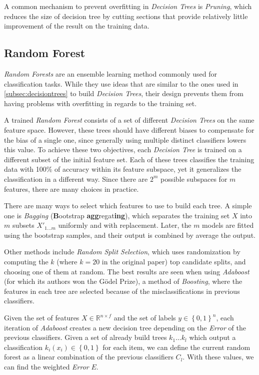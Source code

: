 A common mechanism to prevent overfitting in \emph{Decision Trees} is \emph{Pruning}, which reduces the size of decision tree by cutting sections that provide relatively little improvement of the result on the training data.

\subsection{Random Forest}
\label{subsec:randomforest}

\emph{Random Forests} are an ensemble learning method commonly used for classification tasks.
While they use ideas that are similar to the ones used in \cref{subsec:decisiontrees} to build \emph{Decision Trees}, their design prevents them from having problems with overfitting in regards to the training set\cite{rupert2004elements}.

A trained \emph{Random Forest} consists of a set of different \emph{Decision Trees} on the same feature space.
However, these trees should have different biases to compensate for the bias of a single one, since generally using multiple distinct classifiers lowers this value\cite{ho1994decision}.
To achieve these two objectives, each \emph{Decision Tree} is trained on a different subset of the initial feature set\cite{ho1995random}.
Each of these trees classifies the training data with 100\% of accuracy within its feature subspace, yet it generalizes the classification in a different way. 
Since there are $2^m$ possible subspaces for $m$ features, there are many choices in practice.

There are many ways to select which features to use to build each tree.
A simple one is \emph{Bagging} (\textbf{B}ootstrap \textbf{agg}regat\textbf{ing})\cite{breiman1996bagging}, which separates the training set $X$ into $m$ subsets $X'_{1 \dots m}$ uniformly and with replacement.
Later, the $m$ models are fitted using the bootstrap samples, and their output is combined by average the output.

Other methods include \emph{Random Split Selection}, which uses randomization by computing the $k$ (where $k = 20$ in the original paper) top candidate splits, and choosing one of them at random\cite{dietterich2000experimental}.
The best results are seen when using \emph{Adaboost} (for which its authors won the Gödel Prize), a method of \emph{Boosting}, where the features in each tree are selected because of the misclassifications in previous classifiers\cite{freund1996experiments}.

Given the set of features $X \in \mathbb{R}^{n \times f}$ and the set of labels $y \in \left\{ 0, 1\right \}^n$, each iteration of \emph{Adaboost} creates a new decision tree depending on the \emph{Error} of the previous classifiers.
Given a set of already build trees $k_1 \dots k_l$ which output a classification $k_i \left( x_i \right) \in \left\{ 0, 1 \right\}$ for each item, we can define the current random forest as a linear combination of the previous classifiers $C_l$. With these values, we can find the weighted \emph{Error} $E$.

